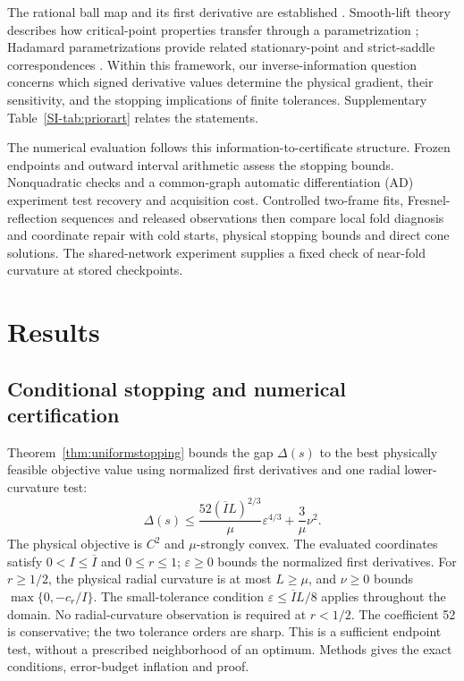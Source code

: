 \documentclass[pdflatex,sn-mathphys-num]{sn-jnl}
\begin{document}
The rational ball map and its first derivative are established \cite[Sec.~V-B, (78)--(79)]{gcopter}. Smooth-lift theory describes how critical-point properties transfer through a parametrization \cite{lifts}; Hadamard parametrizations provide related stationary-point and strict-saddle correspondences \cite{hadamard}. Within this framework, our inverse-information question concerns which signed derivative values determine the physical gradient, their sensitivity, and the stopping implications of finite tolerances. Supplementary Table~\ref{SI-tab:priorart} relates the statements.

The numerical evaluation follows this information-to-certificate structure. Frozen endpoints and outward interval arithmetic assess the stopping bounds. Nonquadratic checks and a common-graph automatic differentiation (AD) experiment test recovery and acquisition cost. Controlled two-frame fits, Fresnel-reflection sequences and released observations then compare local fold diagnosis and coordinate repair with cold starts, physical stopping bounds and direct cone solutions. The shared-network experiment supplies a fixed check of near-fold curvature at stored checkpoints.


\section{Results}
\label{sec:results}

\subsection{Conditional stopping and numerical certification}
\label{sec:certificate_results}
Theorem~\ref{thm:uniformstopping} bounds the gap $\Delta(s)$ to the best physically feasible objective value using normalized first derivatives and one radial lower-curvature test:
\[
 \Delta(s)\leq\frac{52(\overline I L)^{2/3}}{\mu}\varepsilon^{4/3}
             +\frac{3}{\mu}\nu^2.
\]
The physical objective is $C^2$ and $\mu$-strongly convex. The evaluated coordinates satisfy $0<I\leq\overline I$ and $0\leq r\leq1$; $\varepsilon\geq0$ bounds the normalized first derivatives. For $r\geq1/2$, the physical radial curvature is at most $L\geq\mu$, and $\nu\geq0$ bounds $\max\{0,-c_r/I\}$. The small-tolerance condition $\varepsilon\leq\overline I L/8$ applies throughout the domain. No radial-curvature observation is required at $r<1/2$. The coefficient 52 is conservative; the two tolerance orders are sharp. This is a sufficient endpoint test, without a prescribed neighborhood of an optimum. Methods gives the exact conditions, error-budget inflation and proof.
\end{document}
